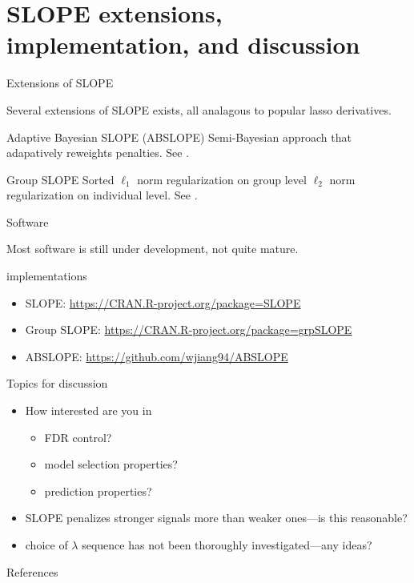\documentclass[10pt]{beamer}
\newif\ifbibliography
\begin{document}
\section{SLOPE extensions, implementation, and discussion}

\begin{frame}{Extensions of SLOPE}

Several extensions of SLOPE exists, all analagous to popular
lasso derivatives.

\begin{block}{Adaptive Bayesian SLOPE (ABSLOPE)}
    Semi-Bayesian approach that adapatively reweights penalties. See \textcite{jiang2019}.
\end{block}

\begin{block}{Group SLOPE}
    Sorted \(\ell_1\) norm regularization on group level
    \(\ell_2\) norm regularization on individual level. See \textcite{brzyski2018}.
\end{block}
\end{frame}

\begin{frame}{Software}

Most software is still under development, not quite mature.\medskip

\begin{block}{implementations}
\begin{itemize}
    \item SLOPE: \url{https://CRAN.R-project.org/package=SLOPE}
    \item Group SLOPE: \url{https://CRAN.R-project.org/package=grpSLOPE}
    \item ABSLOPE: \url{https://github.com/wjiang94/ABSLOPE}
\end{itemize}
\end{block}

\end{frame}

\begin{frame}{Topics for discussion}

\begin{itemize}
    \item How interested are you in 
    \begin{itemize}
        \item FDR control?
        \item model selection properties?
        \item prediction properties?
    \end{itemize}
    \item SLOPE penalizes stronger signals more than weaker ones---is this reasonable?
    \item choice of \(\lambda\) sequence has not been thoroughly investigated---any ideas? 
\end{itemize}
    
\end{frame}

\begin{frame}[allowframebreaks]{References}
  \bibliographytrue
  \printbibliography[heading=none]
\end{frame}
\end{document}
